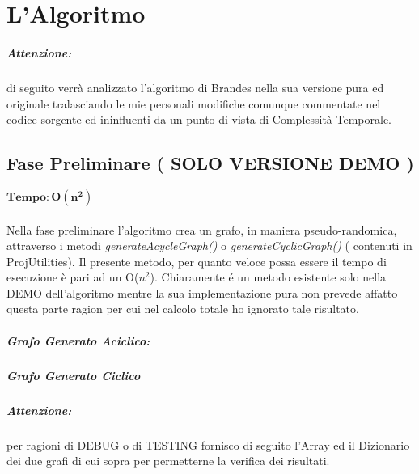 \chapter{L'Algoritmo}
\paragraph{Attenzione:} di seguito verrà analizzato l'algoritmo di Brandes nella sua versione pura ed originale tralasciando le mie personali modifiche comunque commentate nel codice sorgente ed ininfluenti da un punto di vista di Complessità Temporale.

\section{Fase Preliminare ( SOLO VERSIONE DEMO )}
$\mathbf{Tempo: O(n^2)}$\\ 	\\
Nella fase preliminare l'algoritmo crea un grafo, in maniera pseudo-randomica, attraverso i metodi \emph{generateAcycleGraph()} o  \emph{generateCyclicGraph()} ( contenuti in ProjUtilities).
Il presente metodo, per quanto veloce possa essere il tempo di esecuzione è pari ad un O($n^2$). Chiaramente \'e un metodo esistente solo nella DEMO dell'algoritmo mentre la sua implementazione pura non prevede affatto questa parte ragion per cui nel calcolo totale ho ignorato tale risultato.
\newline
\newline

\paragraph{Grafo Generato Aciclico:}


\paragraph{\newline Grafo Generato Ciclico \newline}


\paragraph{Attenzione:} per ragioni di DEBUG o di TESTING fornisco di seguito l'Array ed il Dizionario dei due grafi di cui sopra per permetterne la verifica dei risultati. \newline \newline

